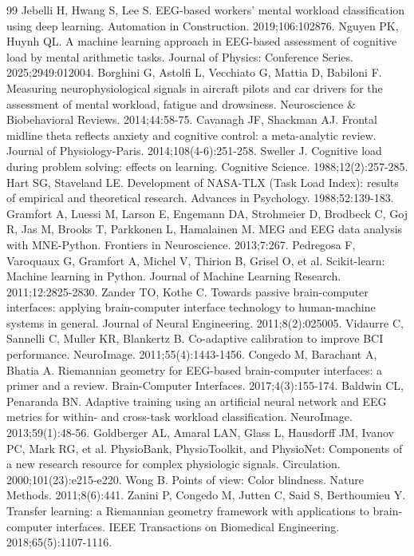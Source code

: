 \begin{thebibliography}{99}
 Jebelli H, Hwang S, Lee S. EEG-based workers' mental workload classification using deep learning. Automation in Construction. 2019;106:102876.
 Nguyen PK, Huynh QL. A machine learning approach in EEG-based assessment of cognitive load by mental arithmetic tasks. Journal of Physics: Conference Series. 2025;2949:012004.
 Borghini G, Astolfi L, Vecchiato G, Mattia D, Babiloni F. Measuring neurophysiological signals in aircraft pilots and car drivers for the assessment of mental workload, fatigue and drowsiness. Neuroscience \& Biobehavioral Reviews. 2014;44:58-75.
 Cavanagh JF, Shackman AJ. Frontal midline theta reflects anxiety and cognitive control: a meta-analytic review. Journal of Physiology-Paris. 2014;108(4-6):251-258.
 Sweller J. Cognitive load during problem solving: effects on learning. Cognitive Science. 1988;12(2):257-285.
 Hart SG, Staveland LE. Development of NASA-TLX (Task Load Index): results of empirical and theoretical research. Advances in Psychology. 1988;52:139-183.
 Gramfort A, Luessi M, Larson E, Engemann DA, Strohmeier D, Brodbeck C, Goj R, Jas M, Brooks T, Parkkonen L, Hamalainen M. MEG and EEG data analysis with MNE-Python. Frontiers in Neuroscience. 2013;7:267.
 Pedregosa F, Varoquaux G, Gramfort A, Michel V, Thirion B, Grisel O, et al. Scikit-learn: Machine learning in Python. Journal of Machine Learning Research. 2011;12:2825-2830.
 Zander TO, Kothe C. Towards passive brain-computer interfaces: applying brain-computer interface technology to human-machine systems in general. Journal of Neural Engineering. 2011;8(2):025005.
 Vidaurre C, Sannelli C, Muller KR, Blankertz B. Co-adaptive calibration to improve BCI performance. NeuroImage. 2011;55(4):1443-1456.
 Congedo M, Barachant A, Bhatia A. Riemannian geometry for EEG-based brain-computer interfaces: a primer and a review. Brain-Computer Interfaces. 2017;4(3):155-174.
 Baldwin CL, Penaranda BN. Adaptive training using an artificial neural network and EEG metrics for within- and cross-task workload classification. NeuroImage. 2013;59(1):48-56.
 Goldberger AL, Amaral LAN, Glass L, Hausdorff JM, Ivanov PC, Mark RG, et al. PhysioBank, PhysioToolkit, and PhysioNet: Components of a new research resource for complex physiologic signals. Circulation. 2000;101(23):e215-e220.
 Wong B. Points of view: Color blindness. Nature Methods. 2011;8(6):441.
 Zanini P, Congedo M, Jutten C, Said S, Berthoumieu Y. Transfer learning: a Riemannian geometry framework with applications to brain-computer interfaces. IEEE Transactions on Biomedical Engineering. 2018;65(5):1107-1116.
\end{thebibliography}

